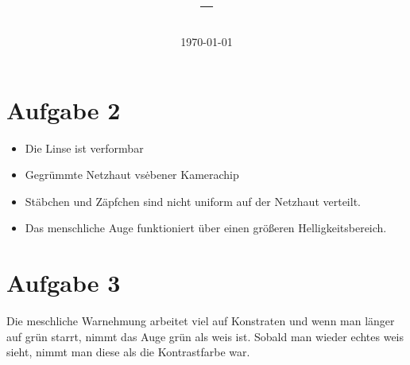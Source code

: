 \documentclass[11pt,a4paper]{article}
\title{\Veranstaltung{} -- \Nummer{} \Uebung{} }
\author{\Tutanden}
\date{\today}
\begin{document}
\maketitle
\thispagestyle{fancy}

\section{Aufgabe 2}

\begin{itemize}
\item Die Linse ist verformbar
\item Gegrümmte Netzhaut vs\. ebener Kamerachip
\item Stäbchen und Zäpfchen sind nicht uniform auf der Netzhaut verteilt.
\item Das menschliche Auge funktioniert über einen größeren Helligkeitsbereich.
\end{itemize}

\section{Aufgabe 3}
Die meschliche Warnehmung arbeitet viel auf Konstraten und wenn man länger
auf grün starrt, nimmt das Auge grün als weis ist. Sobald man wieder echtes weis sieht,
nimmt man diese als die Kontrastfarbe war.
\end{document}
